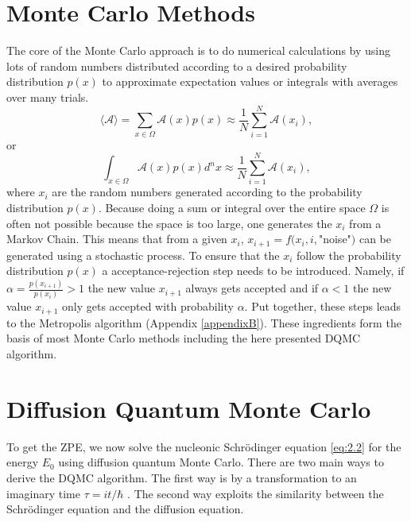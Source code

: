 \documentclass [12pt]{report}
\begin{document}
\section{Monte Carlo Methods}
The core of the Monte Carlo approach is to do numerical calculations by using lots of random numbers distributed according to a desired probability distribution $p(x)$ to approximate expectation values or integrals with averages over many trials.
\begin{equation}
\langle \mathcal{A} \rangle = \sum_{x \in \Omega} \mathcal{A}(x) p(x) \approx \frac{1}{N} \sum_{i=1}^N \mathcal{A}(x_i),
\end{equation}
or
\begin{equation}
\int_{x \in \Omega} \mathcal{A}(x) p(x) d^n x \approx \frac{1}{N} \sum_{i=1}^N \mathcal{A}(x_i),
\end{equation}
where $x_i$ are the random numbers generated according to the probability distribution $p(x)$. Because doing a sum or integral over the entire space $\Omega$ is often not possible because the space is too large, one generates the $x_i$ from a Markov Chain. This means that from a given $x_i$, $x_{i+1} = f(x_i,i,$"noise"$)$ can be generated using a stochastic process. To ensure that the $x_i$ follow the probability distribution $p(x)$ a acceptance-rejection step needs to be introduced. Namely, if $\alpha = \frac{p(x_{i+1})}{p(x_i)} > 1$ the new value $x_{i+1}$ always gets accepted and if $\alpha < 1$ the new value $x_{i+1}$ only gets accepted with probability $\alpha$. Put together, these steps leads to the Metropolis algorithm (Appendix \ref{appendixB}). These ingredients form the basis of most Monte Carlo methods including the here presented DQMC algorithm.

\section{Diffusion Quantum Monte Carlo}
To get the ZPE, we now solve the nucleonic Schrödinger equation \eqref{eq:2.2} for the energy $E_0$ using diffusion quantum Monte Carlo. There are two main ways to derive the DQMC algorithm. The first way is by a transformation to an imaginary time $\tau = it/\hbar$ \cite{mccoy,cyrus}. The second way exploits the similarity between the Schrödinger equation and the diffusion equation.
\end{document}
